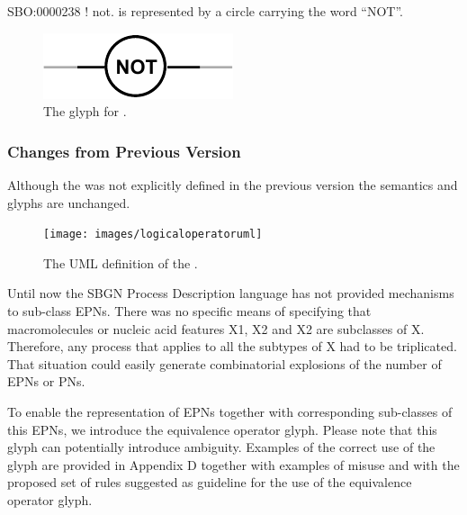 \begin{glyphDescription}
 \glyphSboTerm SBO:0000238 ! not.
 \glyphNode {} is represented by a circle carrying the word ``NOT''.
 \end{glyphDescription}

\begin{figure}[htb]
  \centering
  \includegraphics[scale = 0.5]{images/not}
  \caption{The \PD glyph for .}
  \label{fig:techref:not}
\end{figure}

\subsubsection{Changes from Previous Version}

Although the  was not explicitly defined in
the previous version the semantics and glyphs are unchanged.








\label{sec:techref:relation}
\label{defn:RelationalOperator}

\begin{figure}[htb]
  \centering
  \texttt{[image: images/logicaloperatoruml]}
  \caption{The UML definition of the .}
  \label{fig:techref:logicaloperatoruml}
\end{figure}


Until now the SBGN Process Description language has not provided mechanisms to sub-class EPNs. There was no specific means of specifying that macromolecules or nucleic acid features X1, X2 and X2 are subclasses of X. Therefore, any process that applies to all the subtypes of X had to be triplicated. That situation could easily generate combinatorial explosions of the number of EPNs or PNs. 

To enable the representation of EPNs together with corresponding sub-classes of this EPNs, we introduce the equivalence operator glyph. Please note that this glyph can potentially introduce ambiguity. Examples of the correct use of the glyph are provided in Appendix D together with examples of misuse and with the proposed set of rules suggested as guideline for the use of the equivalence operator glyph.




